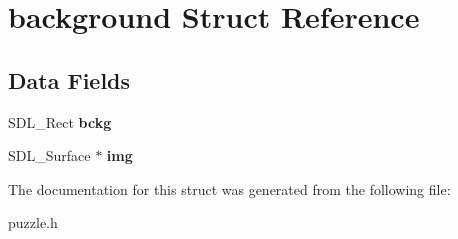 \hypertarget{structbackground}{}\section{background Struct Reference}
\label{structbackground}
\subsection*{Data Fields}
\begin{DoxyCompactItemize}
\item 
\mbox{\label{structbackground_a6cd0518c8d8a98207f008f55de18de1d}} 
S\+D\+L\+\_\+\+Rect {\bfseries bckg}
\item 
\mbox{\label{structbackground_a1c5c3a3ebb56924b9f829602f9641006}} 
S\+D\+L\+\_\+\+Surface $\ast$ {\bfseries img}
\end{DoxyCompactItemize}


The documentation for this struct was generated from the following file\+:\begin{DoxyCompactItemize}
\item 
puzzle.\+h\end{DoxyCompactItemize}
